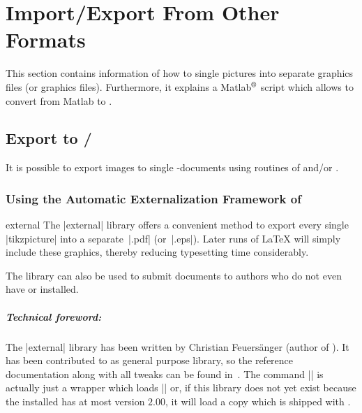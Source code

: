 
\chapter{Import/Export From Other Formats}
\label{sec:pgfplots:importexport}

{

This section contains information of how to single pictures into separate
\pdf{} graphics files (or \eps{} graphics files). Furthermore, it explains a
Matlab$^\text{\textregistered}$ script which allows to convert from Matlab to
\PGFPlots{}.


\section[Export to PDF/EPS]{Export to {\normalfont\pdf{}/\eps{}}}
\label{sec:pgfplots:export}

It is possible to export images to single \pdf{}-documents using routines of
\pgfname{} and/or \Tikz{}.


\subsection{Using the Automatic Externalization Framework of \Tikz}

\begin{pgfplotslibrary}{external}
    The |external| library offers a convenient method to export every single
    |tikzpicture| into a separate~|.pdf| (or~|.eps|). Later runs of \LaTeX{}
    will simply include these graphics, thereby reducing typesetting time
    considerably.

    The library can also be used to submit documents to authors who do not even
    have \PGFPlots{} or \Tikz{} installed.


    \paragraph{Technical foreword:}

    The |external| library has been written by Christian Feuers\"anger (author
    of \PGFPlots). It has been contributed to \Tikz{} as general purpose
    library, so the reference documentation along with all tweaks can be found
    in~\cite[Section ``Externalization Library'']{tikz}. The command
    || is actually just a wrapper which loads
    |\usetikzlibrary{external}| or, if this library does not yet exist because
    the installed \pgfname{} has at most version $2.00$, it will load a copy
    which is shipped with \PGFPlots{}.


\end{pgfplotslibrary}}
